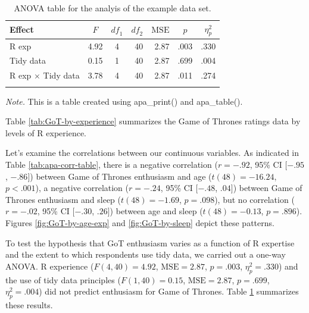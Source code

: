 \documentclass[english,man]{apa6}
\theoremstyle{definition}
\theoremstyle{definition}
\theoremstyle{remark}
\begin{document}
\begin{table}[tbp]
\begin{center}
\begin{threeparttable}
\caption{\label{tab:GoT-aov-table}ANOVA table for the analyis of the example data set.}
\begin{tabular}{lrcrrrl}
\toprule
Effect & \multicolumn{1}{c}{$F$} & \multicolumn{1}{c}{$\mathit{df}_1$} & \multicolumn{1}{c}{$\mathit{df}_2$} & \multicolumn{1}{c}{$\mathrm{MSE}$} & \multicolumn{1}{c}{$p$} & \multicolumn{1}{c}{$\eta^2_p$}\\
\midrule
R exp & 4.92 & 4 & 40 & 2.87 & .003 & .330\\
Tidy data & 0.15 & 1 & 40 & 2.87 & .699 & .004\\
R exp $\times$ Tidy data & 3.78 & 4 & 40 & 2.87 & .011 & .274\\
\bottomrule
\addlinespace
\end{tabular}
\begin{tablenotes}[para]
\textit{Note.} This is a table created using apa\_print() and apa\_table().
\end{tablenotes}
\end{threeparttable}
\end{center}
\end{table}

Table \ref{tab:GoT-by-experience} summarizes the Game of Thrones ratings
data by levels of R experience.

Let's examine the correlations between our continuous variables. As
indicated in Table \ref{tab:apa-corr-table}, there is a negative
correlation (\(r = -.92\), 95\% CI \([-.95\), \(-.86]\)) between Game of
Thrones enthusiasm and age (\(t(48) = -16.24\), \(p < .001\)), a
negative correlation (\(r = -.24\), 95\% CI \([-.48\), \(.04]\)) between
Game of Thrones enthusiasm and sleep (\(t(48) = -1.69\), \(p = .098\)),
but no correlation (\(r = -.02\), 95\% CI \([-.30\), \(.26]\)) between
age and sleep (\(t(48) = -0.13\), \(p = .896\)). Figures
\ref{fig:GoT-by-age-exp} and \ref{fig:GoT-by-sleep} depict these
patterns.

To test the hypothesis that GoT enthusiasm varies as a function of R
expertise and the extent to which respondents use tidy data, we carried
out a one-way ANOVA. R experience (\(F(4, 40) = 4.92\),
\(\mathrm{MSE} = 2.87\), \(p = .003\), \(\eta^2_p = .330\)) and the use
of tidy data principles (\(F(1, 40) = 0.15\), \(\mathrm{MSE} = 2.87\),
\(p = .699\), \(\eta^2_p = .004\)) did not predict enthusiasm for Game
of Thrones. Table \ref{tab:GoT-aov-table} summarizes these results.
\end{document}
